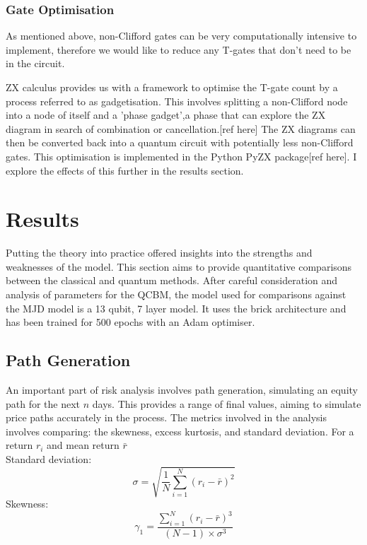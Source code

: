 \documentclass[12pt]{article}
\newcommand{\newp}
    {
    \vskip 0.5cm 
  }
\numberwithin{equation}{section}
\begin{document}
\subsubsection{Gate Optimisation}
As mentioned above, non-Clifford gates can be very computationally intensive to 
implement, therefore we would like to reduce any T-gates that don't need to be 
in the circuit. 
\newp 
ZX calculus provides us with a framework to optimise the T-gate count by a process
referred to as gadgetisation. This involves splitting a non-Clifford node into a 
node of itself and a 'phase gadget',a phase that can explore the ZX diagram in 
search of combination or cancellation.[ref here] The ZX diagrams can then be converted back 
into a quantum circuit with potentially less non-Clifford gates. This optimisation 
is implemented in the Python PyZX package[ref here]. I explore the effects of this 
further in the results section.
\newpage
\section{Results}
Putting the theory into practice offered insights into the strengths and weaknesses 
of the model. This section aims to provide quantitative comparisons between the 
classical and quantum methods. After careful consideration and analysis of parameters 
for the QCBM, the model used for comparisons against the MJD model is a 13 qubit,
7 layer model. It uses the brick architecture and has been trained for 500 epochs 
with an Adam optimiser. 
\subsection{Path Generation}
An important part of risk analysis involves path generation, simulating an equity 
path for the next $n$ days. This provides a range of final values, aiming to 
simulate price paths accurately in the process. The metrics involved in the analysis 
involves comparing: the skewness, excess kurtosis, and standard deviation. 
For a return $r_i$ and mean return $\bar{r}$ 
\\Standard deviation:
$$
\sigma = \sqrt{\frac{1}{N} \sum_{i=1}^{N} (r_i - \bar{r})^2}
$$
Skewness:
$$
\gamma_1 = \frac{\sum_{i=1}^{N} (r_i - \bar{r})^3}{(N-1) \times \sigma^3}
$$
\end{document}
